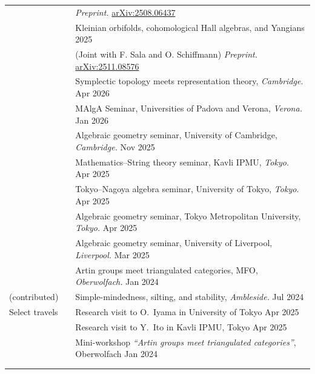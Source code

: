 \documentclass[10pt]{article}
\newcommand{\nextItem}{\\[0.25em]}
\newcommand{\nextSection}{\\[0.5em]}
\begin{document}
\begin{longtable}{>{\raggedleft\arraybackslash}p{0.82in}>{}p{0.05in}>{}p{5.5in}}
     &  & \emph{Preprint.}
    \href{https://arxiv.org/abs/2508.06437}{arXiv:2508.06437}
    \nextItem%
     &  & Kleinian orbifolds, cohomological Hall algebras, and Yangians
    \hfill 2025                                                                            \\
     &  & (Joint with F. Sala and O. Schiffmann) \emph{Preprint.}
    \href{https://arxiv.org/abs/2511.08576}{arXiv:2511.08576}
    \nextSection%
    \multirow{2}{0.8in}{\raggedleft\arraybackslash Select talks (invited)}%
     &  & Symplectic topology meets representation theory, \emph{Cambridge.}
    \hfill Apr 2026\nextItem%
     &  & MAlgA Seminar, Universities of Padova and Verona, \emph{Verona.}
    \hfill Jan 2026\nextItem%
     &  & Algebraic geometry seminar, University of Cambridge, \emph{Cambridge.}
    \hfill Nov 2025\nextItem%
     &  & Mathematics--String theory seminar, Kavli IPMU, \emph{Tokyo.}
    \hfill Apr 2025\nextItem%
     &  & Tokyo--Nagoya algebra seminar, University of Tokyo, \emph{Tokyo.}
    \hfill Apr 2025\nextItem%
     &  & Algebraic geometry seminar, Tokyo Metropolitan University, \emph{Tokyo.}
    \hfill Apr 2025\nextItem%
     &  & Algebraic geometry seminar, University of Liverpool, \emph{Liverpool.}
    \hfill Mar 2025\nextItem%
     &  & Artin groups meet triangulated categories, MFO, \emph{Oberwolfach.}
    \hfill Jan 2024\nextItem%
    (contributed)%
     &  & Simple-mindedness, silting, and stability, \emph{Ambleside.}
    \hfill Jul 2024\nextSection%
    Select travels
     &  &  Research visit to O.\ Iyama in University of Tokyo \hfill Apr 2025 \\[0.25em]
     &  &  Research visit to Y.\ Ito in Kavli IPMU, Tokyo \hfill Apr 2025 \\[0.25em]
     &  &  Mini-workshop \emph{``Artin groups meet triangulated categories''}, Oberwolfach \hfill Jan 2024 
      \\\\[-0.4em]

    \pagebreak


\end{longtable}
\end{document}
